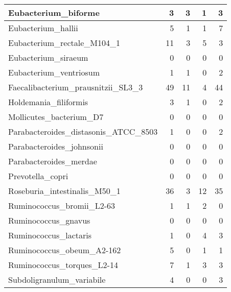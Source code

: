 \documentclass[12pt,a4paper]{article}
\begin{document}
\begin{table}[ht]
\begin{center}
\begin{tabular}{|l*{4}{|r}|}
Eubacterium\_biforme & 3 & 3 & 1 & 3 \\ \hline
Eubacterium\_hallii & 5 & 1 & 1 & 7 \\ \hline
Eubacterium\_rectale\_M104\_1 & 11 & 3 & 5 & 3 \\ \hline
Eubacterium\_siraeum & 0 & 0 & 0 & 0 \\ \hline
Eubacterium\_ventriosum & 1 & 1 & 0 & 2 \\ \hline
Faecalibacterium\_prausnitzii\_SL3\_3 & 49 & 11 & 4 & 44 \\ \hline
Holdemania\_filiformis & 3 & 1 & 0 & 2 \\ \hline
Mollicutes\_bacterium\_D7 & 0 & 0 & 0 & 0 \\ \hline
Parabacteroides\_distasonis\_ATCC\_8503 & 1 & 0 & 0 & 2 \\ \hline
Parabacteroides\_johnsonii & 0 & 0 & 0 & 0 \\ \hline
Parabacteroides\_merdae & 0 & 0 & 0 & 0 \\ \hline
Prevotella\_copri & 0 & 0 & 0 & 0 \\ \hline
Roseburia\_intestinalis\_M50\_1 & 36 & 3 & 12 & 35 \\ \hline
Ruminococcus\_bromii\_L2-63 & 1 & 1 & 2 & 0 \\ \hline
Ruminococcus\_gnavus & 0 & 0 & 0 & 0 \\ \hline
Ruminococcus\_lactaris & 1 & 0 & 4 & 3 \\ \hline
Ruminococcus\_obeum\_A2-162 & 5 & 0 & 1 & 1 \\ \hline
Ruminococcus\_torques\_L2-14 & 7 & 1 & 3 & 3 \\ \hline
Subdoligranulum\_variabile & 4 & 0 & 0 & 3 \\ \hline
\end{tabular}
\end{center}
\end{table}
\end{document}
